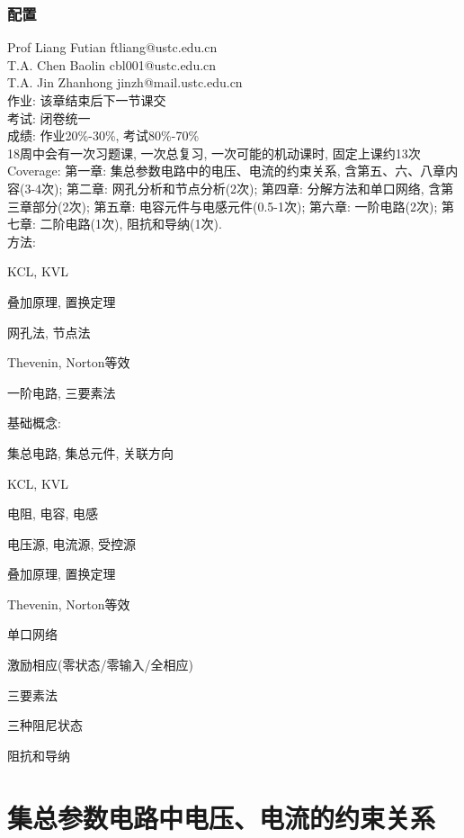 \documentclass{ctexart}
\begin{document}
\subsubsection*{配置} %
\label{ssub:配置}

\noindent
Prof Liang Futian ftliang@ustc.edu.cn \\
T.A. Chen Baolin cbl001@ustc.edu.cn \\
T.A. Jin Zhanhong jinzh@mail.ustc.edu.cn \\
作业: 该章结束后下一节课交\\
考试: 闭卷统一\\
成绩: 作业20\%-30\%, 考试80\%-70\%\\
18周中会有一次习题课, 一次总复习, 一次可能的机动课时, 固定上课约13次\\
Coverage: 第一章: 集总参数电路中的电压、电流的约束关系, 含第五、六、八章内容(3-4次); 第二章: 网孔分析和节点分析(2次); 第四章: 分解方法和单口网络, 含第三章部分(2次); 第五章: 电容元件与电感元件(0.5-1次); 第六章: 一阶电路(2次); 第七章: 二阶电路(1次), 阻抗和导纳(1次). \\
方法:
\begin{cenum}
    \item KCL, KVL
    \item 叠加原理, 置换定理
    \item 网孔法, 节点法
    \item Thevenin, Norton等效
    \item 一阶电路, 三要素法
\end{cenum}
基础概念:
\begin{cenum}
    \item 集总电路, 集总元件, 关联方向
    \item KCL, KVL
    \item 电阻, 电容, 电感
    \item 电压源, 电流源, 受控源
    \item 叠加原理, 置换定理
    \item Thevenin, Norton等效
    \item 单口网络
    \item 激励相应(零状态/零输入/全相应)
    \item 三要素法
    \item 三种阻尼状态
    \item 阻抗和导纳
\end{cenum}


\section{集总参数电路中电压、电流的约束关系} %
\label{sec:集总参数电路中电压_电流的约束关系}
\end{document}
